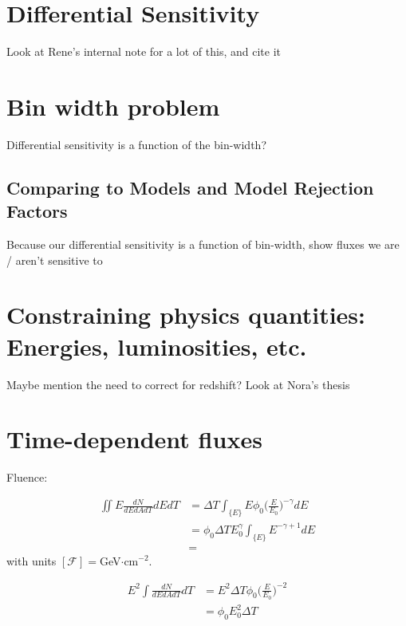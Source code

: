 \documentclass[a4paper,11pt]{article}
\begin{document}
\section{Differential Sensitivity}
Look at Rene's internal note for a lot of this, and cite it

\section{Bin width problem}
Differential sensitivity is a function of the bin-width?

\subsection{Comparing to Models and Model Rejection Factors}
Because our differential sensitivity is a function of bin-width, show fluxes we are / aren't sensitive to

\section{Constraining physics quantities: Energies, luminosities, etc.}
Maybe mention the need to correct for redshift? Look at Nora's thesis

\section{Time-dependent fluxes}

Fluence:

\begin{align}
    \iint E \frac{dN}{dEdAdT} dE dT &= \Delta T \int_{\{E\}} E \phi_0 \Big(\frac{E}{E_0}\Big)^{-\gamma} dE \\
    &= \phi_0 \Delta T E_0^{\gamma} \int_{\{E\}} E^{-\gamma + 1} dE \\ 
    &= 
\end{align}
with units $[ \mathcal{F}] = $GeV$\cdot$cm$^{-2}$.

\begin{align}
    E^2 \int \frac{dN}{dEdAdT} dT &= E^2 \Delta T \phi_0 \Big(\frac{E}{E_0}\Big)^{-2} \\
    &= \phi_0 E_0^2 \Delta T 
\end{align}



\end{document}
